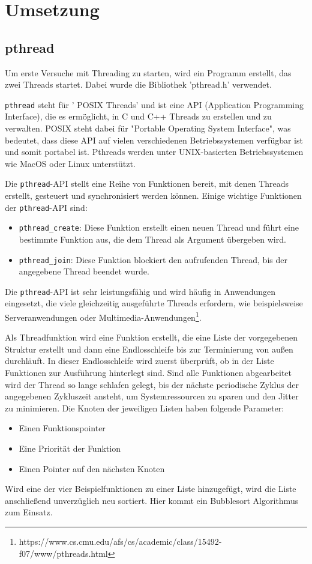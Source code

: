 \chapter{Umsetzung}
\label{cha:Umsetzung}
\section{pthread}
Um erste Versuche mit Threading zu starten, wird ein Programm erstellt, das zwei Threads startet. 
Dabei wurde die Bibliothek 'pthread.h' verwendet. 

\texttt{pthread} steht für ' POSIX Threads' und ist eine API (Application Programming Interface), die es ermöglicht, in C und C++ Threads zu erstellen und zu verwalten. POSIX steht dabei für "Portable Operating System Interface", was bedeutet, dass diese API auf vielen verschiedenen Betriebssystemen verfügbar ist und somit portabel ist. Pthreads werden unter UNIX-basierten Betriebssystemen wie MacOS oder Linux unterstützt. 

Die \texttt{pthread}-API stellt eine Reihe von Funktionen bereit, mit denen Threads erstellt, gesteuert und synchronisiert werden können. Einige wichtige Funktionen der \texttt{pthread}-API sind:

\begin{itemize}
\item \verb|pthread_create|: Diese Funktion erstellt einen neuen Thread und führt eine bestimmte Funktion aus, die dem Thread als Argument übergeben wird.
\item \verb|pthread_join|: Diese Funktion blockiert den aufrufenden Thread, bis der angegebene Thread beendet wurde.
\end{itemize}

Die \texttt{pthread}-API ist sehr leistungsfähig und wird häufig in Anwendungen eingesetzt, die viele gleichzeitig ausgeführte Threads erfordern, wie beispielsweise Serveranwendungen oder Multimedia-Anwendungen\footnote[2]{https://www.cs.cmu.edu/afs/cs/academic/class/15492-f07/www/pthreads.html}. 

Als Threadfunktion wird eine Funktion erstellt, die eine Liste der vorgegebenen Struktur erstellt und dann eine Endlosschleife bis zur Terminierung von außen durchläuft. In dieser Endlosschleife wird zuerst überprüft, ob in der Liste Funktionen zur Ausführung hinterlegt sind. Sind alle Funktionen abgearbeitet wird der Thread so lange schlafen gelegt, bis der nächste periodische Zyklus der angegebenen Zykluszeit ansteht, um Systemressourcen zu sparen und den Jitter zu minimieren. 
Die Knoten der jeweiligen Listen haben folgende Parameter: 
\begin{itemize}
\item Einen Funktionspointer
\item Eine Priorität der Funktion
\item Einen Pointer auf den nächsten Knoten
\end{itemize}
Wird eine der vier Beispielfunktionen zu einer Liste hinzugefügt, wird die Liste anschließend unverzüglich neu sortiert. Hier kommt ein Bubblesort Algorithmus zum Einsatz.  

